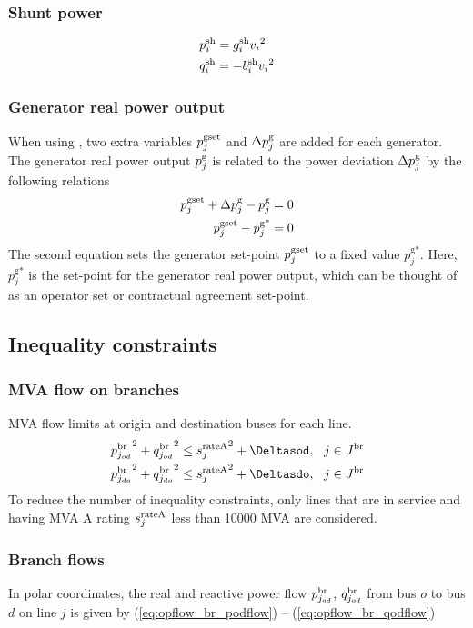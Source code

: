  \subsubsection{Shunt power}
\begin{align}
&p^{\text{sh}}_i = g^\text{sh}_i{v_i}^2 \label{eq:opflow_sh_p} \\
&q^{\text{sh}}_i = -b^\text{sh}_i{v_i}^2 \label{eq:opflow_sh_q}
\end{align}

\subsubsection{Generator real power output}

When using \option{\opflowgensetpoint}, two extra variables $p^{\text{gset}}_j$ and $\Delta{p}^\text{g}_j$ are added for each generator. The generator real power output $p^\text{g}_j$ is related to the power deviation $\Delta{p}^\text{g}_j$ by the following relations
\begin{align}
  p^{\text{gset}}_j + \Delta{p}^\text{g}_j - p^\text{g}_j = 0 \\
  p^{\text{gset}}_j - p^{\text{g*}}_j = 0
\end{align}
The second equation sets the generator set-point $p^{\text{gset}}_j$ to a fixed value $p^{\text{g*}}_j$. Here, $p^{\text{g*}}_j$ is the set-point for the generator real power output, which can be thought of as an operator set or contractual agreement set-point.

\subsection{Inequality constraints}

\subsubsection{MVA flow on branches}
MVA flow limits at origin and destination buses for each line.
\begin{align}
  {\pbrjod}^2 + {\qbrjod}^2 \le {\srateAj}^2 + \Deltasod,~~\jinJbr\\
  {\pbrjdo}^2 + {\qbrjdo}^2 \le {\srateAj}^2 + \Deltasdo,~~\jinJbr
\end{align}
To reduce the number of inequality constraints, only lines that are in service and having MVA A rating $s^{\text{rateA}}_j$ less than 10000 MVA are considered.

\subsubsection{Branch flows}
In polar coordinates, the real and reactive power flow $p^\text{br}_{j_{od}}$, $q^\text{br}_{j_{od}}$  from bus $o$ to bus $d$ on line $j$ is given by (\ref{eq:opflow_br_podflow}) -- 
 (\ref{eq:opflow_br_qodflow})


